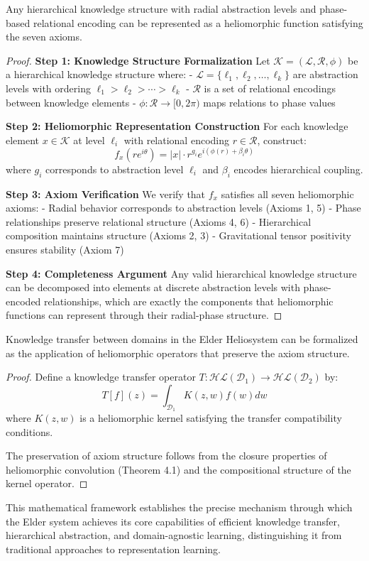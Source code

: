\begin{theorem}
\label{thm:representational_completeness}
Any hierarchical knowledge structure with radial abstraction levels and phase-based relational encoding can be represented as a heliomorphic function satisfying the seven axioms.
\end{theorem}

\begin{proof}
\textbf{Step 1: Knowledge Structure Formalization}
Let $\mathcal{K} = (\mathcal{L}, \mathcal{R}, \phi)$ be a hierarchical knowledge structure where:
- $\mathcal{L} = \{\ell_1, \ell_2, \ldots, \ell_k\}$ are abstraction levels with ordering $\ell_1 > \ell_2 > \cdots > \ell_k$
- $\mathcal{R}$ is a set of relational encodings between knowledge elements
- $\phi: \mathcal{R} \rightarrow [0, 2\pi)$ maps relations to phase values

\textbf{Step 2: Heliomorphic Representation Construction}
For each knowledge element $x \in \mathcal{K}$ at level $\ell_i$ with relational encoding $r \in \mathcal{R}$, construct:
$$f_x(re^{i\theta}) = |x| \cdot r^{g_i} e^{i(\phi(r) + \beta_i \theta)}$$
where $g_i$ corresponds to abstraction level $\ell_i$ and $\beta_i$ encodes hierarchical coupling.

\textbf{Step 3: Axiom Verification}
We verify that $f_x$ satisfies all seven heliomorphic axioms:
- Radial behavior corresponds to abstraction levels (Axioms 1, 5)
- Phase relationships preserve relational structure (Axioms 4, 6)
- Hierarchical composition maintains structure (Axioms 2, 3)
- Gravitational tensor positivity ensures stability (Axiom 7)

\textbf{Step 4: Completeness Argument}
Any valid hierarchical knowledge structure can be decomposed into elements at discrete abstraction levels with phase-encoded relationships, which are exactly the components that heliomorphic functions can represent through their radial-phase structure.
\end{proof}

\begin{corollary}
\label{cor:knowledge_transfer}
Knowledge transfer between domains in the Elder Heliosystem can be formalized as the application of heliomorphic operators that preserve the axiom structure.
\end{corollary}

\begin{proof}
Define a knowledge transfer operator $T: \mathcal{HL}(\mathcal{D}_1) \rightarrow \mathcal{HL}(\mathcal{D}_2)$ by:
$$T[f](z) = \int_{\mathcal{D}_1} K(z,w) f(w) dw$$
where $K(z,w)$ is a heliomorphic kernel satisfying the transfer compatibility conditions.

The preservation of axiom structure follows from the closure properties of heliomorphic convolution (Theorem 4.1) and the compositional structure of the kernel operator.
\end{proof}

This mathematical framework establishes the precise mechanism through which the Elder system achieves its core capabilities of efficient knowledge transfer, hierarchical abstraction, and domain-agnostic learning, distinguishing it from traditional approaches to representation learning.